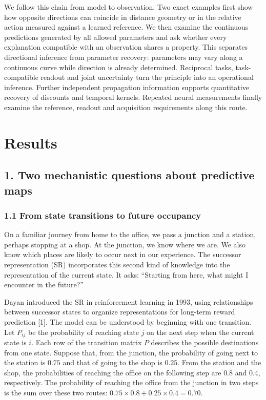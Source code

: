 \documentclass[11pt,a4paper]{article}
\begin{document}
We follow this chain from model to observation. Two exact examples first
show how opposite directions can coincide in distance geometry or in the
relative action measured against a learned reference. We then examine
the continuous predictions generated by all allowed parameters and ask
whether every explanation compatible with an observation shares a
property. This separates directional inference from parameter recovery:
parameters may vary along a continuous curve while direction is already
determined. Reciprocal tasks, task-compatible readout and joint
uncertainty turn the principle into an operational inference. Further
independent propagation information supports quantitative recovery of
discounts and temporal kernels. Repeated neural measurements finally
examine the reference, readout and acquisition requirements along this
route.

\section{Results}\label{results}

\subsection{1. Two mechanistic questions about predictive
maps}\label{two-mechanistic-questions-about-predictive-maps}

\subsubsection{1.1 From state transitions to future
occupancy}\label{from-state-transitions-to-future-occupancy}

On a familiar journey from home to the office, we pass a junction and a
station, perhaps stopping at a shop. At the junction, we know where we
are. We also know which places are likely to occur next in our
experience. The successor representation (SR) incorporates this second
kind of knowledge into the representation of the current state. It asks:
“Starting from here, what might I encounter in the future?”

Dayan introduced the SR in reinforcement learning in 1993, using
relationships between successor states to organize representations for
long-term reward prediction {[}1{]}. The model can be understood by
beginning with one transition. Let \(P_{ij}\) be the probability of
reaching state \(j\) on the next step when the current state is \(i\).
Each row of the transition matrix \(P\) describes the possible
destinations from one state. Suppose that, from the junction, the
probability of going next to the station is \(0.75\) and that of going
to the shop is \(0.25\). From the station and the shop, the
probabilities of reaching the office on the following step are \(0.8\)
and \(0.4\), respectively. The probability of reaching the office from
the junction in two steps is the sum over these two routes:
\(0.75\times0.8+0.25\times0.4=0.70\).
\end{document}
